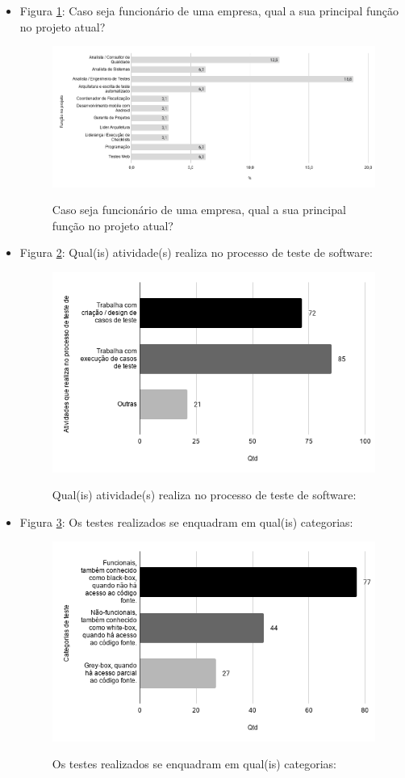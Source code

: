 \begin{itemize}
    
    
    \item Figura \ref{figure:s_funcaoprojeto}: Caso seja funcionário de uma empresa, qual a sua principal função no projeto atual?
    \begin{figure}[!htb]
    \centering
    \includegraphics[width=.55\textwidth]{images/s_funcaoprojeto.png}
    \label{figure:s_funcaoprojeto}
    \caption{Caso seja funcionário de uma empresa, qual a sua principal função no projeto atual?}
    \end{figure}
    
    
    \item Figura \ref{figure:s_atividadesprojeto}: Qual(is) atividade(s) realiza no processo de teste de software:
    \begin{figure}[!htb]
    \centering
    \includegraphics[width=.55\textwidth]{images/s_atividadesprojeto.png}
    \label{figure:s_atividadesprojeto}
    \caption{Qual(is) atividade(s) realiza no processo de teste de software:}
    \end{figure}   
    
    
    \item Figura \ref{figure:s_categoriastestes}: Os testes realizados se enquadram em qual(is) categorias:
    \begin{figure}[!htb]
    \centering
    \includegraphics[width=.55\textwidth]{images/s_categoriastestes.png}
    \label{figure:s_categoriastestes}
    \caption{Os testes realizados se enquadram em qual(is) categorias:}
    \end{figure}       
    

\end{itemize}
